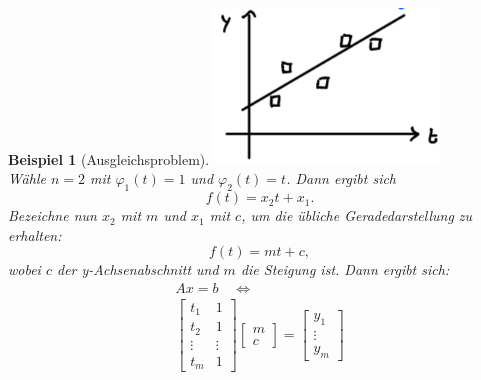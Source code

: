 \documentclass[12pt]{article}
\theoremstyle{break}
\newtheorem{example}[theorem]{Beispiel}
\begin{document}
\begin{example}[Ausgleichsproblem] \leavevmode
\includegraphics[width=6cm]{Bild6.png}\\
Wähle $n=2$ mit $\varphi_1(t) = 1$ und $\varphi_2(t) = t$. Dann ergibt sich
$$f(t) = x_2t + x_1.$$
Bezeichne nun $x_2$ mit $m$ und $x_1$ mit $c$, um die übliche Geradedarstellung zu erhalten:
$$f(t) = mt + c,$$
wobei $c$ der y-Achsenabschnitt und $m$ die Steigung ist.
Dann ergibt sich:
\begin{align*}
&Ax = b \quad \Leftrightarrow &\\
&\left[ \begin{matrix} t_1 & 1 \\ t_2 & 1 \\ \vdots & \vdots \\ t_m & 1 \end{matrix} \right] \left[ \begin{matrix} m \\ c \end{matrix} \right] = \left[ \begin{matrix} y_1 \\ \vdots \\ y_m \end{matrix} \right]
\end{align*}
\end{example}
\end{document}

